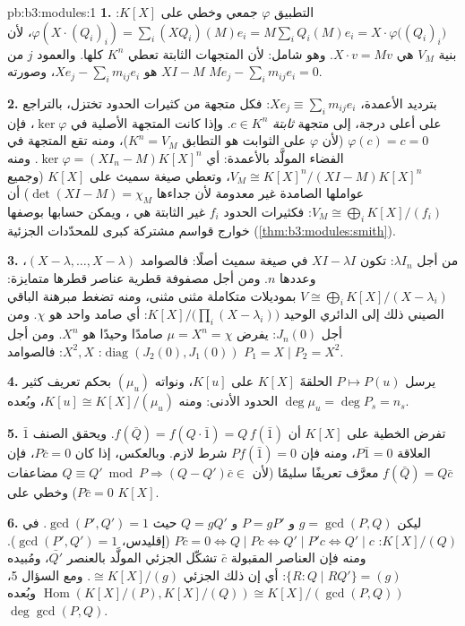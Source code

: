 \begin{solution}{pb:b3:modules:1}
\textbf{1.} التطبيق $\varphi$ جمعي وخطي على $K[X]$: $\varphi(X
\cdot (Q_i)_i) = \sum_i (XQ_i)(M)e_i = M\sum_i Q_i(M)e_i = X
\cdot \varphi\bigl((Q_i)_i\bigr)$،
لأن بنية  $V_M$ هي $X \cdot v = Mv$. وهو شامل: لأن
المتجهات الثابتة تعطي $K^n$ كلها. والعمود $j$ من $XI - M$ هو
$Xe_j - \sum_i
m_{ij}e_i$، وصورته $Me_j - \sum_i m_{ij}e_i = 0$.

\textbf{2.} بترديد الأعمدة، $Xe_j \equiv \sum_i m_{ij}e_i$: فكل متجهة من كثيرات الحدود
تختزل، بالتراجع على أعلى درجة، إلى متجهة \emph{ثابتة}
$c \in K^n$. وإذا كانت المتجهة الأصلية في $\ker\varphi$، فإن
$\varphi(c) = c = 0$ (لأن $\varphi$ على الثوابت هو التطابق $K^n = V_M$)،
ومنه تقع المتجهة في الفضاء المولَّد بالأعمدة: أي $\ker\varphi = (XI_n -
M)K[X]^n$. ومنه
$V_M \cong K[X]^n/(XI - M)K[X]^n$، وتعطي صيغة سميث على $K[X]$ (وجميع عواملها الصامدة غير
معدومة لأن جداءها $\det(XI - M) = \chi_M$) أن $V_M \cong \bigoplus_i
K[X]/(f_i)$: فكثيرات الحدود $f_i$
غير الثابتة هي ، ويمكن حسابها بوصفها خوارج قواسم
مشتركة كبرى للمحدّدات الجزئية (\cref{thm:b3:modules:smith}).

\textbf{3.} من أجل $\lambda I_n$: تكون $XI - \lambda I$ في صيغة
سميث أصلًا: فالصوامد $(X - \lambda, \dots, X - \lambda)$، وعددها $n$. ومن أجل مصفوفة قطرية
عناصر قطرها متمايزة: $V \cong \bigoplus_i K[X]/(X -
\lambda_i)$ بموديلات متكاملة مثنى مثنى، ومنه
تضغط مبرهنة الباقي الصيني ذلك إلى  الدائري الوحيد $K[X]/\bigl(\prod_i(X - \lambda_i)\bigr)$:
أي صامد واحد هو $\chi$. ومن أجل $J_n(0)$: يفرض $\mu = X^n = \chi$ صامدًا
وحيدًا هو $X^n$. ومن أجل $\operatorname{diag}(J_2(0), J_1(0))$:  $X^2, X$:
فالصوامد $P_1 = X \mid P_2 =
X^2$.

\textbf{4.} يرسل $P \mapsto P(u)$ الحلقةَ $K[X]$ على $K[u]$،
ونواته $(\mu_u)$ بحكم تعريف كثير الحدود الأدنى: ومنه $K[u]
\cong K[X]/(\mu_u)$،
وبُعده $\deg\mu_u = \deg P_s = n_s$.

\textbf{5.} تفرض الخطية على $K[X]$ أن $f(\bar Q) = f(Q\cdot\bar 1)
= Q\,f(\bar 1)$. ويحقق الصنف
$\bar 1$ العلاقة $P \bar 1 = 0$، ومنه فإن $P f(\bar 1) = 0$ شرط لازم.
وبالعكس، إذا كان $P\bar c = 0$، فإن $f(\bar Q) = Q\bar c$ معرَّف تعريفًا
سليمًا (لأن $Q \equiv Q' \bmod P
\Rightarrow (Q - Q')\bar c \in$ مضاعفات $P\bar c = 0$) وخطي على $K[X]$.

\textbf{6.} ليكن $g = \gcd(P, Q)$ و $P = gP'$ و $Q = gQ'$ حيث
$\gcd(P', Q') = 1$. في $K[X]/(Q)$: $P\bar c = 0 \iff Q \mid Pc
\iff Q' \mid P'c \iff Q' \mid c$ (إقليدس، $\gcd(P', Q') = 1$). ومنه فإن
العناصر المقبولة $\bar c$ تشكّل  الجزئي المولَّد
بالعنصر $\bar{Q'}$، ومُبيده $\{R : Q \mid RQ'\} = (g)$: أي إن ذلك  الجزئي
$\cong K[X]/(g)$. ومع السؤال 5،
$\operatorname{Hom}(K[X]/(P), K[X]/(Q)) \cong K[X]/(\gcd(P,Q))$
وبُعده $\deg\gcd(P,Q)$.


\end{solution}
